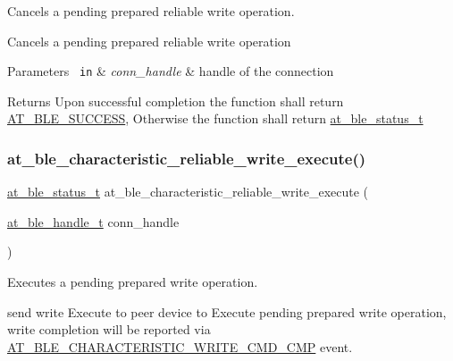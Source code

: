 Cancels a pending prepared reliable write operation. 

Cancels a pending prepared reliable write operation


\begin{DoxyParams}[1]{Parameters}
\mbox{\texttt{ in}}  & {\em conn\+\_\+handle} & handle of the connection\\
\hline
\end{DoxyParams}
\begin{DoxyReturn}{Returns}
Upon successful completion the function shall return \mbox{\hyperlink{group__error__codes__group_gga3b1db9b95feb157b3c188ca27fe76988a7e3bfff5387331cd4f2c56cbcbbd7e19}{A\+T\+\_\+\+B\+L\+E\+\_\+\+S\+U\+C\+C\+E\+SS}}, Otherwise the function shall return \mbox{\hyperlink{at__ble__api_8h_ace24eb4e5ca3f325c663b809da5feb92}{at\+\_\+ble\+\_\+status\+\_\+t}} 
\end{DoxyReturn}
\mbox{\label{group__gatt__client__group_ga9a3982336528fec5ec5c59f8937075cc}} 
\subsubsection{\texorpdfstring{at\_ble\_characteristic\_reliable\_write\_execute()}{at\_ble\_characteristic\_reliable\_write\_execute()}}
{\footnotesize\ttfamily \mbox{\hyperlink{group__error__codes__group_ga3b1db9b95feb157b3c188ca27fe76988}{at\+\_\+ble\+\_\+status\+\_\+t}} at\+\_\+ble\+\_\+characteristic\+\_\+reliable\+\_\+write\+\_\+execute (\begin{DoxyParamCaption}\item[{\mbox{\hyperlink{at__ble__api_8h_abd23646d0c662860741f787efc8456f2}{at\+\_\+ble\+\_\+handle\+\_\+t}}}]{conn\+\_\+handle }\end{DoxyParamCaption})}



Executes a pending prepared write operation. 

send write Execute to peer device to Execute pending prepared write operation, write completion will be reported via \mbox{\hyperlink{at__ble__api_8h_a3324640b95f33169515f89738ed5baeba0ca3bb3c57359b42fd8d578907e6c315}{A\+T\+\_\+\+B\+L\+E\+\_\+\+C\+H\+A\+R\+A\+C\+T\+E\+R\+I\+S\+T\+I\+C\+\_\+\+W\+R\+I\+T\+E\+\_\+\+C\+M\+D\+\_\+\+C\+MP}} event.


